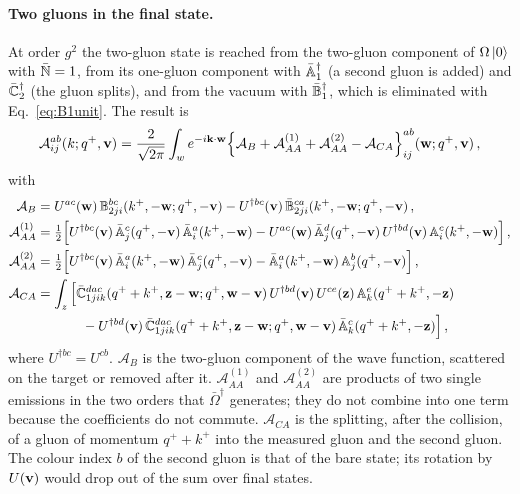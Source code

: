 \paragraph{Two gluons in the final state.} At order $g^2$ the two-gluon state is reached from the two-gluon component of $\Omega\ket0$ with $\bar{\mathbb{N}}=1$, from its one-gluon component with $\bar{\mathbb{A}}^\dagger_1$ (a second gluon is added) and $\bar{\mathbb{C}}_2^\dagger$ (the gluon splits), and from the vacuum with $\bar{\mathbb{B}}_1^\dagger$, which is eliminated with Eq.~\eqref{eq:B1unit}. The result is
\begin{align}\label{eq:A2gamp}
\mathcal A^{ab}_{ij}(k;q^+,\mathbf{v})=\frac{2}{\sqrt{2\pi}}\int_w e^{-i\mathbf{k}\cdot\mathbf{w}}\Big\{\mathcal A_B+\mathcal A^{(1)}_{AA}+\mathcal A^{(2)}_{AA}-\mathcal A_{CA}\Big\}^{ab}_{ij}(\mathbf{w};q^+,\mathbf{v})\,,
\end{align}
with
\begin{align}\label{eq:A2parts}
\mathcal A_B&=U^{ac}(\mathbf{w})\,\mathbb{B}^{bc}_{2ji}(k^+,-\mathbf{w};q^+,-\mathbf{v})-U^{\dagger bc}(\mathbf{v})\,\bar{\mathbb{B}}^{ca}_{2ji}(k^+,-\mathbf{w};q^+,-\mathbf{v})\,,
\notag\\
\mathcal A^{(1)}_{AA}&=\tfrac12\Big[U^{\dagger bc}(\mathbf{v})\,\bar{\mathbb{A}}^c_j(q^+,-\mathbf{v})\,\bar{\mathbb{A}}^a_i(k^+,-\mathbf{w})-U^{ac}(\mathbf{w})\,\bar{\mathbb{A}}^d_j(q^+,-\mathbf{v})\,U^{\dagger bd}(\mathbf{v})\,\mathbb{A}^c_i(k^+,-\mathbf{w})\Big]\,,
\notag\\
\mathcal A^{(2)}_{AA}&=\tfrac12\Big[U^{\dagger bc}(\mathbf{v})\,\bar{\mathbb{A}}^a_i(k^+,-\mathbf{w})\,\bar{\mathbb{A}}^c_j(q^+,-\mathbf{v})-\bar{\mathbb{A}}^a_i(k^+,-\mathbf{w})\,\mathbb{A}^b_j(q^+,-\mathbf{v})\Big]\,,
\notag\\
\mathcal A_{CA}&=\int_z\Big[\bar{\mathbb{C}}^{dac}_{1jik}(q^++k^+,\mathbf{z}-\mathbf{w};q^+,\mathbf{w}-\mathbf{v})\,U^{\dagger bd}(\mathbf{v})\,U^{ce}(\mathbf{z})\,\mathbb{A}^e_k(q^++k^+,-\mathbf{z})
\notag\\&\hspace{1.2cm}
-U^{\dagger bd}(\mathbf{v})\,\bar{\mathbb{C}}^{dac}_{1jik}(q^++k^+,\mathbf{z}-\mathbf{w};q^+,\mathbf{w}-\mathbf{v})\,\bar{\mathbb{A}}^c_k(q^++k^+,-\mathbf{z})\Big]\,,
\end{align}
where $U^{\dagger bc}=U^{cb}$. $\mathcal A_B$ is the two-gluon component of the wave function, scattered on the target or removed after it. $\mathcal A^{(1)}_{AA}$ and $\mathcal A^{(2)}_{AA}$ are products of two single emissions in the two orders that $\bar\Omega^\dagger$ generates; they do not combine into one term because the coefficients do not commute. $\mathcal A_{CA}$ is the splitting, after the collision, of a gluon of momentum $q^++k^+$ into the measured gluon and the second gluon. The colour index $b$ of the second gluon is that of the bare state; its rotation by $U(\mathbf{v})$ would drop out of the sum over final states.

